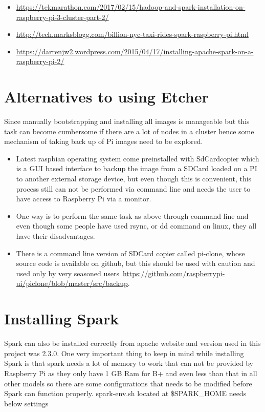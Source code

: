 
\begin{itemize}
\item 
\url{https://tekmarathon.com/2017/02/15/hadoop-and-spark-installation-on-raspberry-pi-3-cluster-part-2/}
\item \url{http://tech.marksblogg.com/billion-nyc-taxi-rides-spark-raspberry-pi.html}
\item \url{https://darrenjw2.wordpress.com/2015/04/17/installing-apache-spark-on-a-raspberry-pi-2/}
\end{itemize}

\section{Alternatives to using Etcher}

Since manually bootstrapping and installing all images is manageable
but this task can become cumbersome if there are a lot of nodes in a
cluster hence some mechanism of taking back up of Pi images need to be
explored.


\begin{itemize}
\item Latest raspbian operating system come preinstalled with
  SdCardcopier which is a GUI based interface to backup the image from
  a SDCard loaded on a PI to another external storage device, but even
  though this is convenient, this process still can not be performed
  via command line and needs the user to have access to Raspberry Pi
  via a monitor.
\item One way is to perform the same task as above through command
  line and even though some people have used rsync, or dd command on
  linux, they all have their disadvantages.
\item There is a command line version of SDCard copier called
  pi-clone, whose source code is available on github, but this should
  be used with caution and used only by very seasoned
  users~\url{https://github.com/raspberrypi-ui/piclone/blob/master/src/backup}.
\end{itemize}

\section{Installing Spark}

Spark can also be installed correctly from apache website and version
used in this project was 2.3.0. One very important thing to keep in
mind while installing Spark is that spark needs a lot of memory to
work that can not be provided by Raspberry Pi as they only have 1 GB
Ram for B+ and even less than that in all other models so there are
some configurations that needs to be modified before Spark can
function properly.  spark-env.sh located at \$SPARK\_HOME needs below
settings

